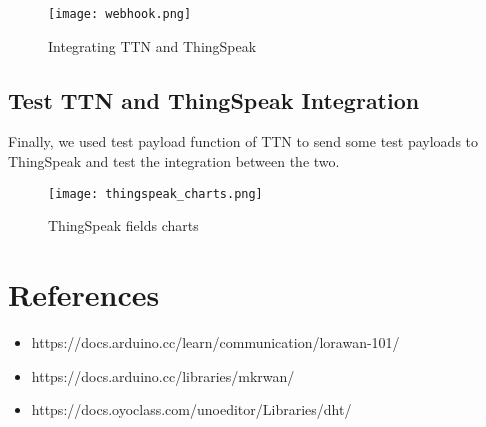 \begin{figure}[H]
    \centering
    \texttt{[image: webhook.png]}
    \caption{Integrating TTN and ThingSpeak}
\end{figure}

\subsection{Test TTN and ThingSpeak Integration}
Finally, we used test payload function of TTN to send some test payloads to ThingSpeak and test the integration between the two.

\begin{figure}[H]
    \centering
    \texttt{[image: thingspeak\_charts.png]}
    \caption{ThingSpeak fields charts}
\end{figure}

\section{References}
\begin{itemize}
\item https://docs.arduino.cc/learn/communication/lorawan-101/
\item https://docs.arduino.cc/libraries/mkrwan/
\item https://docs.oyoclass.com/unoeditor/Libraries/dht/
\end{itemize}


